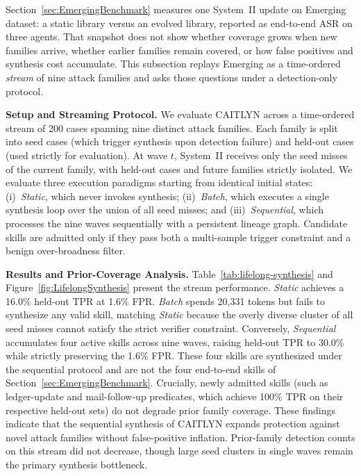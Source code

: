 Section~\ref{sec:EmergingBenchmark} measures one System~II update on
Emerging dataset: a static library versus an evolved library, reported as
end-to-end ASR on three agents. That snapshot does not show whether
coverage grows when new families arrive, whether earlier families
remain covered, or how false positives and synthesis cost
accumulate. This subsection replays Emerging as a time-ordered \emph{stream}
of nine attack families and asks those questions under a
detection-only protocol.

\noindent
\textbf{Setup and Streaming Protocol.}
We evaluate CAITLYN across a time-ordered stream of 200 cases spanning
nine distinct attack families. Each family is split into seed cases
(which trigger synthesis upon detection failure) and held-out cases
(used strictly for evaluation). At wave $t$, System~II receives only
the seed misses of the current family, with held-out cases and future
families strictly isolated. We evaluate three execution paradigms
starting from identical initial states: (i)~\textit{Static}, which
never invokes synthesis; (ii)~\textit{Batch}, which executes a single
synthesis loop over the union of all seed misses; and
(iii)~\textit{Sequential}, which processes the nine waves sequentially
with a persistent lineage graph. Candidate skills are admitted only if
they pass both a multi-sample trigger constraint and a benign
over-broadness filter.

\noindent
\textbf{Results and Prior-Coverage Analysis.}
Table~\ref{tab:lifelong-synthesis} and
Figure~\ref{fig:LifelongSynthesis} present the stream
performance. \textit{Static} achieves a 16.0\% held-out TPR at 1.6\%
FPR. \textit{Batch} spends 20,331 tokens but fails to synthesize any
valid skill, matching \textit{Static} because the overly diverse
cluster of all seed misses cannot satisfy the strict verifier
constraint. Conversely, \textit{Sequential} accumulates four active
skills across nine waves, raising held-out TPR to 30.0\% while
strictly preserving the 1.6\% FPR. These four skills are synthesized
under the sequential protocol and are not the four end-to-end skills of
Section~\ref{sec:EmergingBenchmark}. Crucially,
newly admitted skills (such as ledger-update and mail-follow-up
predicates, which achieve 100\% TPR on their respective held-out sets)
do not degrade prior family coverage. These findings indicate that
the sequential synthesis of CAITLYN expands protection against
novel attack families without false-positive inflation. Prior-family
detection counts on this stream did not decrease, though large seed
clusters in single waves remain the primary synthesis bottleneck.


